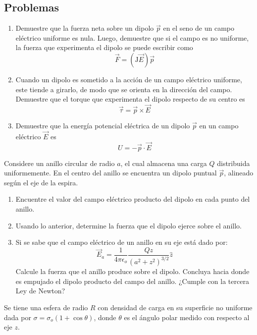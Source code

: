 \subsection{Problemas}

\np

\begin{enumerate}[label=\alph*)]
    \item Demuestre que la fuerza neta sobre un dipolo $\Vec{p}$ en el seno de un campo eléctrico uniforme es nula. Luego, demuestre que si el campo es no uniforme, la fuerza que experimenta el dipolo se puede escribir como
    \[\Vec{F} = (\mathrm{J}\Vec{E})\Vec{p}\]
    \item Cuando un dipolo es sometido a la acción de un campo eléctrico uniforme, este tiende a girarlo, de modo que se orienta en la dirección del campo. Demuestre que el torque que experimenta el dipolo respecto de su centro es
    \[\Vec{\tau} = \Vec{p}\times \Vec{E}\]
    \item Demuestre que la energía potencial eléctrica de un dipolo $\Vec{p}$ en un campo eléctrico $\Vec{E}$ es
    \[U=-\Vec{p}\cdot\Vec{E}\]
\end{enumerate}

\np
 Considere un anillo circular de radio $a$, el cual almacena una carga $Q$ distribuida uniformemente. En el centro del anillo se encuentra un dipolo puntual $\Vec{p}$, alineado según el eje de la espira.
 
\begin{enumerate}[label=\alph*)]
    \item Encuentre el valor del campo eléctrico producto del dipolo en cada punto del anillo.
    \item Usando lo anterior, determine la fuerza que el dipolo ejerce sobre el anillo.
    \item Si se sabe que el campo eléctrico de un anillo en su eje está dado por:
    \[\Vec{E}_a = \frac{1}{4\pi\epsilon_o}
    \frac{Qz}{(a^2+z^2)^{3/2}}\hat{z}\]
    Calcule la fuerza que el anillo produce sobre el dipolo. Concluya hacia donde es empujado el dipolo producto del campo del anillo. ¿Cumple con la tercera Ley de Newton?
\end{enumerate}

\bigbreak

\np

Se tiene una esfera de radio $R$ con densidad de carga en su superficie no uniforme dada por $\sigma = \sigma_o(1 + \cos{\theta})$, donde $\theta$ es el ángulo polar medido con respecto al eje $z$.

